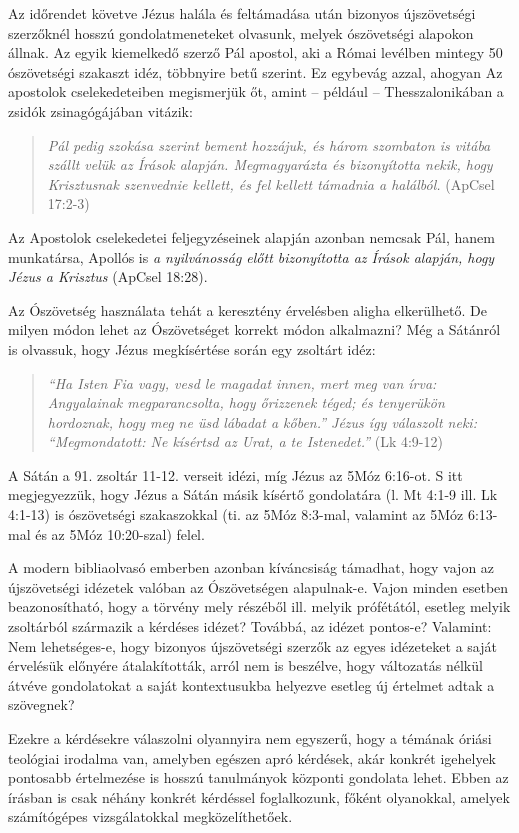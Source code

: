 \documentclass{article}
\begin{document}
Az időrendet követve Jézus halála és feltámadása után bizonyos újszövetségi szerzőknél hosszú gondolatmeneteket olvasunk,
melyek ószövetségi alapokon állnak. Az egyik kiemelkedő szerző Pál apostol, aki a Római levélben
mintegy 50 ószövetségi szakaszt idéz, többnyire betű szerint. Ez egybevág azzal, ahogyan
Az apostolok cselekedeteiben megismerjük őt, amint -- például -- Thesszalonikában a zsidók zsinagógájában
vitázik:
\begin{quote}
\textit{Pál pedig szokása szerint bement hozzájuk, és három szombaton is vitába
szállt velük az Írások alapján. Megmagyarázta és bizonyította nekik, hogy
Krisztusnak szenvednie kellett, és fel kellett támadnia a halálból.} (ApCsel 17:2-3)
\end{quote}
Az Apostolok cselekedetei feljegyzéseinek alapján azonban nemcsak Pál, hanem munkatársa,
Apollós is \textit{a nyilvánosság előtt bizonyította az Írások alapján, hogy Jézus a Krisztus}
(ApCsel 18:28). 

Az Ószövetség használata tehát a keresztény érvelésben aligha elkerülhető. De milyen módon lehet
az Ószövetséget korrekt módon alkalmazni? Még a Sátánról is olvassuk, hogy Jézus megkísértése
során egy zsoltárt idéz: 
\begin{quote}
\textit{``Ha Isten Fia vagy, vesd le magadat innen, mert meg van írva:
Angyalainak megparancsolta, hogy őrizzenek téged; 
és tenyerükön hordoznak, hogy meg ne üsd lábadat a kőben.''
Jézus így válaszolt neki: ``Megmondatott: Ne kísértsd az Urat, a te Istenedet.''} (Lk 4:9-12)
\end{quote}
A Sátán a 91. zsoltár 11-12. verseit idézi, míg Jézus az 5Móz 6:16-ot. S itt megjegyezzük,
hogy Jézus a Sátán másik kísértő gondolatára (l. Mt 4:1-9 ill. Lk 4:1-13) is ószövetségi szakaszokkal
(ti. az 5Móz 8:3-mal, valamint az 5Móz 6:13-mal és az 5Móz 10:20-szal) felel.

A modern bibliaolvasó emberben azonban kíváncsiság támadhat, hogy vajon az újszövetségi idézetek
valóban az Ószövetségen alapulnak-e. Vajon minden esetben beazonosítható, hogy a törvény mely
részéből ill. melyik prófétától, esetleg melyik zsoltárból származik a kérdéses idézet?
Továbbá, az idézet pontos-e? Valamint: Nem lehetséges-e, hogy bizonyos újszövetségi szerzők az egyes
idézeteket a saját érvelésük előnyére átalakították, arról nem is beszélve, hogy változatás
nélkül átvéve gondolatokat a saját kontextusukba helyezve esetleg új értelmet adtak a szövegnek?

Ezekre a kérdésekre válaszolni olyannyira nem egyszerű, hogy a témának óriási teológiai irodalma
van, amelyben egészen apró kérdések, akár konkrét igehelyek pontosabb értelmezése is
hosszú tanulmányok központi gondolata lehet. Ebben az írásban is csak néhány konkrét kérdéssel
foglalkozunk, főként olyanokkal, amelyek számítógépes vizsgálatokkal megközelíthetőek.
\end{document}
